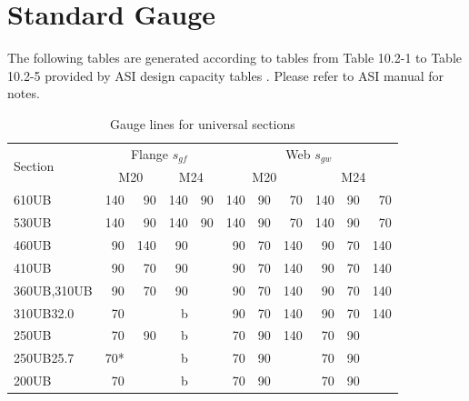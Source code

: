 \section{Standard Gauge}
The following tables are generated according to tables from Table 10.2-1 to Table 10.2-5 provided by ASI design capacity tables \citep{ASI2016}.
Please refer to ASI manual for notes.
\begin{table}[H]
\centering\footnotesize
\caption{Gauge lines for universal sections}\label{tab:universal_gauge}
\begin{minipage}{.8\linewidth}\centering
\begin{tabular}{l|rr|rr|rrr|rrr}
	\toprule
	\multirow{2}[0]{*}{Section} &        \multicolumn{4}{c|}{Flange $s_{gf}$}         &          \multicolumn{6}{c}{Web $s_{gw}$}          \\
	                            & \multicolumn{2}{c|}{M20} & \multicolumn{2}{c|}{M24} & \multicolumn{3}{c|}{M20} & \multicolumn{3}{c}{M24} \\ \midrule
	610UB                       &  140 &                90 & 140 &                 90 & 140 & 90 &            70 & 140 & 90 &           70 \\
	530UB                       &  140 &                90 & 140 &                 90 & 140 & 90 &            70 & 140 & 90 &           70 \\
	460UB                       &   90 &               140 &  90 &                    &  90 & 70 &           140 &  90 & 70 &          140 \\
	410UB                       &   90 &                70 &  90 &                    &  90 & 70 &           140 &  90 & 70 &          140 \\
	360UB,310UB                 &   90 &                70 &  90 &                    &  90 & 70 &           140 &  90 & 70 &          140 \\
	310UB32.0                   &   70 &                   &   b &                    &  90 & 70 &           140 &  90 & 70 &          140 \\
	250UB                       &   70 &                90 &   b &                    &  70 & 90 &           140 &  70 & 90 &              \\
	250UB25.7                   &  70* &                   &   b &                    &  70 & 90 &               &  70 & 90 &              \\
	200UB                       &   70 &                   &   b &                    &  70 & 90 &               &  70 & 90 &              \\

\end{tabular}
\end{minipage}
\end{table}
